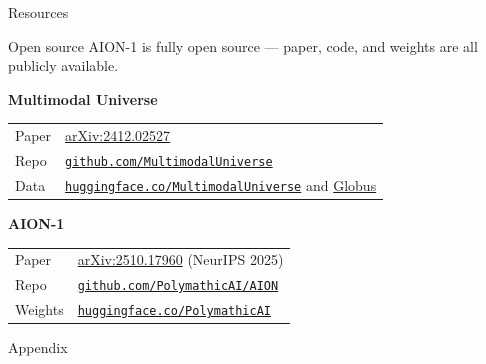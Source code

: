 \documentclass[10pt]{beamer}
\begin{document}
\begingroup
{}
\begin{frame}[noframenumbering]{Resources}
  \begin{alertblock}{Open source}
    AION-1 is fully open source — paper, code, and weights are all publicly available.
  \end{alertblock}
  \vspace{0.4em}
  \textbf{Multimodal Universe}\\[0.2em]
  {\small\begin{tabular}{@{}ll@{}}
    Paper   & \href{https://arxiv.org/abs/2412.02527}{arXiv:2412.02527} \\
    Repo    & \href{https://github.com/MultimodalUniverse/MultimodalUniverse}%
              {\texttt{github.com/MultimodalUniverse}} \\
    Data    & \href{https://huggingface.co/MultimodalUniverse}%
              {\texttt{huggingface.co/MultimodalUniverse}} and
              \href{https://app.globus.org/file-manager?origin_id=57136152-fc1d-418e-b74e-75ca52bddd21}%
              {Globus} \\
  \end{tabular}}

  \vspace{0.8em}
  \textbf{AION-1}\\[0.2em]
  {\small\begin{tabular}{@{}ll@{}}
    Paper   & \href{https://arxiv.org/abs/2510.17960}{arXiv:2510.17960}
              (NeurIPS 2025) \\
    Repo    & \href{https://github.com/PolymathicAI/AION}%
              {\texttt{github.com/PolymathicAI/AION}} \\
    Weights & \href{https://huggingface.co/PolymathicAI}%
              {\texttt{huggingface.co/PolymathicAI}} \\
  \end{tabular}}
\end{frame}
\endgroup

\begin{frame}[standout]
  Appendix
\end{frame}
\end{document}
